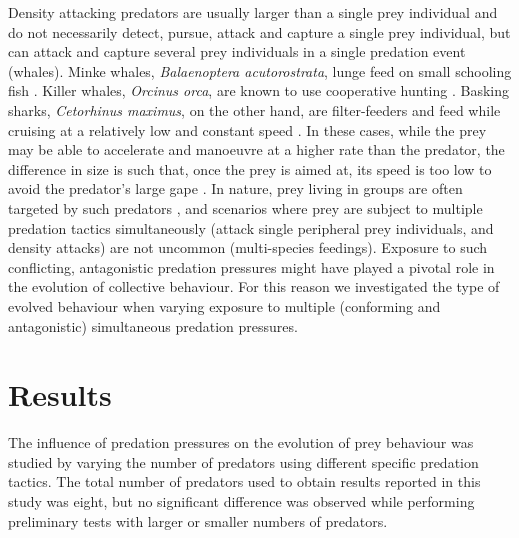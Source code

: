 Density attacking predators are usually larger than a single prey individual and do not necessarily detect, pursue, attack and capture a single prey individual, but can attack and capture several prey individuals in a single predation event (\eg whales). Minke whales, \emph{Balaenoptera acutorostrata}, lunge feed on small schooling fish \cite{hoelzel1989foraging}. Killer whales, \emph{Orcinus orca}, are known to use cooperative hunting \cite{domenici2000killer,nottestad1999herring}. Basking sharks, \emph{Cetorhinus maximus}, on the other hand, are filter-feeders and feed while cruising at a relatively low and constant speed \cite{sims2000filterfeeding}. In these cases, while the prey may be able to accelerate and manoeuvre at a higher rate than the predator, the difference in size is such that, once the prey is aimed at, its speed is too low to avoid the predator's large gape \cite{domenici2001scaling}. In nature, prey living in groups are often targeted by such predators \cite{domenici2001scaling,goldbogen2011mechanics,nottestad1999herring,nottestad2002whales}, and scenarios where prey are subject to multiple predation tactics simultaneously (\eg attack single peripheral prey individuals, and density attacks) are not uncommon (\eg multi-species feedings)\cite{haynes2013molecular,mori2006first,thiebault2015howto}. Exposure to such conflicting, antagonistic predation pressures might have played a pivotal role in the evolution of collective behaviour. For this reason we investigated the type of evolved behaviour when varying exposure to multiple (conforming and antagonistic) simultaneous predation pressures.

\section{Results}

The influence of predation pressures on the evolution of prey behaviour was studied by varying the number of predators using different specific predation tactics. The total number of predators used to obtain results reported in this study was eight, but no significant difference was observed while performing preliminary tests with larger or smaller numbers of predators.


